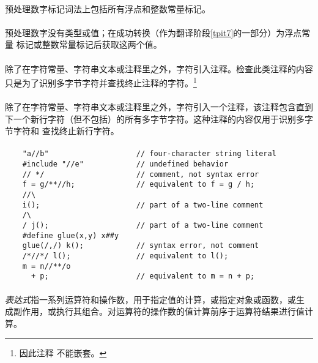 \paragraph{}
预处理数字标记词法上包括所有浮点和整数常量标记。

\semantic
\paragraph{}
预处理数字没有类型或值；在成功转换（作为翻译阶段\ref{tpit7}的一部分）为浮点常量
标记或整数常量标记后获取这两个值。

\paragraph{}
除了在字符常量、字符串文本或注释里之外，字符\tm{/*}引入注释。检查此类注释的内容
只是为了识别多字节字符并查找终止注释的字符\tm{*/}。\footnote{因此注释
不能嵌套。}

\paragraph{}
除了在字符常量、字符串文本或注释里之外，字符\tm{//}引入一个注释，该注释包含直到
下一个新行字符（但不包括）的所有多字节字符。这种注释的内容仅用于识别多字节字符和
查找终止新行字符。

\paragraph{}
\ex*
\begin{lstlisting}
    "a//b"                    // four-character string literal
    #include "//e"            // undefined behavior
    // */                     // comment, not syntax error
    f = g/**//h;              // equivalent to f = g / h;
    //\
    i();                      // part of a two-line comment
    /\
    / j();                    // part of a two-line comment
    #define glue(x,y) x##y
    glue(/,/) k();            // syntax error, not comment
    /*//*/ l();               // equivalent to l();
    m = n//**/o
      + p;                    // equivalent to m = n + p;
\end{lstlisting}

\paragraph{}
\textit{表达式}指一系列运算符和操作数，用于指定值的计算，或指定对象或函数，或生
成副作用，或执行其组合。对运算符的操作数的值计算前序于运算符结果进行值计算。

